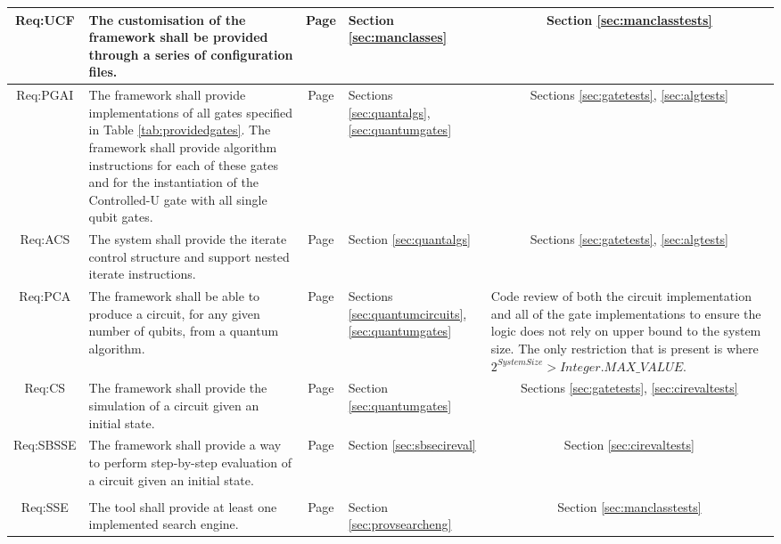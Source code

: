 \begin{landscape}
\begin{longtable}{|c|m{10cm}|c|m{3cm}|m{3cm}|}
Req:UCF &
The customisation of the framework shall be provided through a series of configuration files. &
Page \pageref{sec:requcf} &
Section \ref{sec:manclasses} &
\multicolumn{1}{c|}{Section \ref{sec:manclasstests}} \\ \hline

Req:PGAI &
The framework shall provide implementations of all gates specified in Table \ref{tab:providedgates}. The framework shall provide algorithm instructions for each of these gates and for the instantiation of the Controlled-U gate with all single qubit gates. &
Page \pageref{sec:reqpgai} &
Sections \ref{sec:quantalgs}, \ref{sec:quantumgates} &
\multicolumn{1}{c|}{Sections \ref{sec:gatetests}, \ref{sec:algtests}} \\ \hline

Req:ACS &
The system shall provide the iterate control structure and support nested iterate instructions. &
Page \pageref{sec:reqacs} &
Section \ref{sec:quantalgs} &
\multicolumn{1}{c|}{Sections \ref{sec:gatetests}, \ref{sec:algtests}} \\ \hline

Req:PCA &
The framework shall be able to produce a circuit, for any given number of qubits, from a quantum algorithm. &
Page \pageref{sec:reqpca} &
Sections \ref{sec:quantumcircuits}, \ref{sec:quantumgates} &
Code review of both the circuit implementation and all of the gate implementations to ensure the logic does not rely on upper bound to the system size.
The only restriction that is present is where $2^{System Size}>Integer.MAX\_VALUE$. \\ \hline

Req:CS &
The framework shall provide the simulation of a circuit given an initial state. &
Page \pageref{sec:reqcs} &
Section \ref{sec:quantumgates} &
\multicolumn{1}{c|}{Sections \ref{sec:gatetests}, \ref{sec:cirevaltests}} \\ \hline

Req:SBSSE &
The framework shall provide a way to perform step-by-step evaluation of a circuit given an initial state. &
Page \pageref{sec:reqsbsse} &
Section \ref{sec:sbsecireval} &
\multicolumn{1}{c|}{Section \ref{sec:cirevaltests}} \\ \hline

&&&&
\\ \hline

Req:SSE &
The tool shall provide at least one implemented search engine. &
Page \pageref{sec:reqsse} &
Section \ref{sec:provsearcheng} &
\multicolumn{1}{c|}{Section \ref{sec:manclasstests}} \\ \hline


\end{longtable}
\end{landscape}
